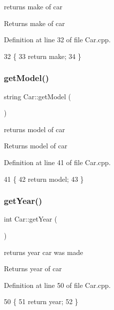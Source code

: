 returns make of car

\begin{DoxyReturn}{Returns}
make of car 
\end{DoxyReturn}


Definition at line 32 of file Car.\+cpp.


\begin{DoxyCode}
32                     \{
33     \textcolor{keywordflow}{return} make;
34 \}
\end{DoxyCode}
\mbox{\label{class_car_a289787c878ee8aa2f5bd111ff2d927f5}} 
\subsubsection{\texorpdfstring{get\+Model()}{getModel()}}
{\footnotesize\ttfamily string Car\+::get\+Model (\begin{DoxyParamCaption}{ }\end{DoxyParamCaption})}

returns model of car

\begin{DoxyReturn}{Returns}
model of car 
\end{DoxyReturn}


Definition at line 41 of file Car.\+cpp.


\begin{DoxyCode}
41                      \{
42     \textcolor{keywordflow}{return} model;
43 \}
\end{DoxyCode}
\mbox{\label{class_car_a41336fc661d8919c2323a3b4554e3a19}} 
\subsubsection{\texorpdfstring{get\+Year()}{getYear()}}
{\footnotesize\ttfamily int Car\+::get\+Year (\begin{DoxyParamCaption}{ }\end{DoxyParamCaption})}

returns year car was made

\begin{DoxyReturn}{Returns}
year of car 
\end{DoxyReturn}


Definition at line 50 of file Car.\+cpp.


\begin{DoxyCode}
50                  \{
51     \textcolor{keywordflow}{return} year;
52 \}
\end{DoxyCode}
\mbox{\label{class_car_ae7eb35511bf597b017bfbaaa6f91ff79}} 

